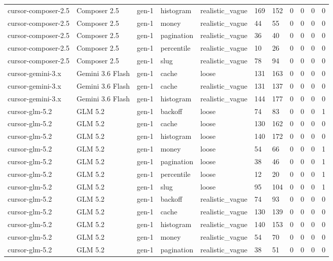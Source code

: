 \begin{tabular}{lllllllllll}
cursor-composer-2.5 & Composer 2.5 & gen-1 & histogram & realistic\_vague & 169 & 152 & 0 & 0 & 0 & 0 \\
cursor-composer-2.5 & Composer 2.5 & gen-1 & money & realistic\_vague & 44 & 55 & 0 & 0 & 0 & 0 \\
cursor-composer-2.5 & Composer 2.5 & gen-1 & pagination & realistic\_vague & 36 & 40 & 0 & 0 & 0 & 0 \\
cursor-composer-2.5 & Composer 2.5 & gen-1 & percentile & realistic\_vague & 10 & 26 & 0 & 0 & 0 & 0 \\
cursor-composer-2.5 & Composer 2.5 & gen-1 & slug & realistic\_vague & 78 & 94 & 0 & 0 & 0 & 0 \\
cursor-gemini-3.x & Gemini 3.6 Flash & gen-1 & cache & loose & 131 & 163 & 0 & 0 & 0 & 0 \\
cursor-gemini-3.x & Gemini 3.6 Flash & gen-1 & cache & realistic\_vague & 131 & 137 & 0 & 0 & 0 & 0 \\
cursor-gemini-3.x & Gemini 3.6 Flash & gen-1 & histogram & realistic\_vague & 144 & 177 & 0 & 0 & 0 & 0 \\
cursor-glm-5.2 & GLM 5.2 & gen-1 & backoff & loose & 74 & 83 & 0 & 0 & 0 & 1 \\
cursor-glm-5.2 & GLM 5.2 & gen-1 & cache & loose & 130 & 162 & 0 & 0 & 0 & 0 \\
cursor-glm-5.2 & GLM 5.2 & gen-1 & histogram & loose & 140 & 172 & 0 & 0 & 0 & 0 \\
cursor-glm-5.2 & GLM 5.2 & gen-1 & money & loose & 54 & 66 & 0 & 0 & 0 & 1 \\
cursor-glm-5.2 & GLM 5.2 & gen-1 & pagination & loose & 38 & 46 & 0 & 0 & 0 & 1 \\
cursor-glm-5.2 & GLM 5.2 & gen-1 & percentile & loose & 12 & 20 & 0 & 0 & 0 & 1 \\
cursor-glm-5.2 & GLM 5.2 & gen-1 & slug & loose & 95 & 104 & 0 & 0 & 0 & 1 \\
cursor-glm-5.2 & GLM 5.2 & gen-1 & backoff & realistic\_vague & 74 & 93 & 0 & 0 & 0 & 0 \\
cursor-glm-5.2 & GLM 5.2 & gen-1 & cache & realistic\_vague & 130 & 139 & 0 & 0 & 0 & 0 \\
cursor-glm-5.2 & GLM 5.2 & gen-1 & histogram & realistic\_vague & 140 & 153 & 0 & 0 & 0 & 0 \\
cursor-glm-5.2 & GLM 5.2 & gen-1 & money & realistic\_vague & 54 & 70 & 0 & 0 & 0 & 0 \\
cursor-glm-5.2 & GLM 5.2 & gen-1 & pagination & realistic\_vague & 38 & 51 & 0 & 0 & 0 & 0 \\

\end{tabular}
